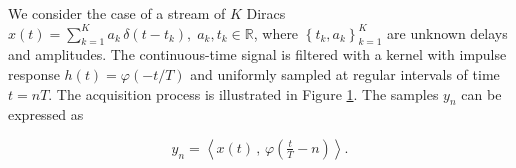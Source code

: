 \documentclass{article}
\newcommand{\DeltaTrain}{
  \draw[rounded corners, dashed] (-1cm,-2mm) rectangle (1cm,1cm);
  \draw[->] (-6mm,0) -- (-6mm,4mm);
  \draw[->] (0,0) -- (0,8mm);
  \draw[->] (4mm,0) -- (4mm,5mm);
  \draw[->] (6mm,0) -- (6mm,7mm);
  \draw (-9mm,0) -- (9mm,0);
  \node[empty, minimum width=2.4cm, minimum height=1cm]{};
}
\newcommand{\Sampling}{
  \coordinate (A) at (-2.4mm,0mm);
  \coordinate (B) at (2.4mm,0mm);
  \coordinate (P) at ($(A) + (45:4.8mm)$);
  \coordinate (Q) at ($(A) + (80:2.5mm)$);
  \draw (A) -- (P);
  \draw[->] (Q) arc (95:-25:2.5mm);
  \draw node[empty,above] at (P) {\scriptstyle t=nT};
  \node[empty, minimum width=4.8mm]{};
}
\begin{document}
We consider the case of a stream of $K$ Diracs
$x(t) = \sum_{k = 1}^{K} a_k \, \delta \left( t - t_k \right), \; a_k,t_k \in \mathbb{R}$,
where $\left\lbrace t_k, a_k \right\rbrace_{k=1}^{K}$ are unknown delays and amplitudes.
The continuous-time signal is filtered with 
a kernel with impulse response $h(t) = \varphi(-t/T)$ and uniformly sampled at regular
intervals of time $t = n T$. The acquisition process is illustrated in Figure \ref{fig:filter_n_sample}.
The samples $y_n$ can be expressed as

\begin{equation}
y_n = \left\langle x(t) \, , \, \varphi(\tfrac{t}{T} - n) \right\rangle.
\label{eq:y_n}
\end{equation}

\begin{figure}[t]
\centering
{}
\label{fig:filter_n_sample}
\end{figure}
\end{document}
